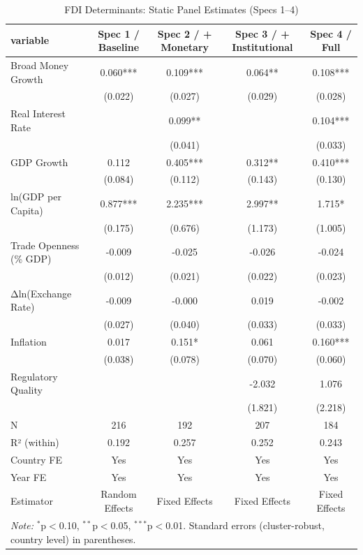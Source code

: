 \begin{table}[htbp]
\centering
\caption{FDI Determinants: Static Panel Estimates (Specs 1–4)}
\label{tab:regression_specs1_4}
\begin{tabular}{lcccc}
\hline\hline
variable & Spec 1 / Baseline & Spec 2 / + Monetary & Spec 3 / + Institutional & Spec 4 / Full \\
\hline
Broad Money Growth & 0.060*** & 0.109*** & 0.064** & 0.108*** \\
 & (0.022) & (0.027) & (0.029) & (0.028) \\
Real Interest Rate &  & 0.099** &  & 0.104*** \\
 &  & (0.041) &  & (0.033) \\
GDP Growth & 0.112 & 0.405*** & 0.312** & 0.410*** \\
 & (0.084) & (0.112) & (0.143) & (0.130) \\
ln(GDP per Capita) & 0.877*** & 2.235*** & 2.997** & 1.715* \\
 & (0.175) & (0.676) & (1.173) & (1.005) \\
Trade Openness (\% GDP) & -0.009 & -0.025 & -0.026 & -0.024 \\
 & (0.012) & (0.021) & (0.022) & (0.023) \\
Δln(Exchange Rate) & -0.009 & -0.000 & 0.019 & -0.002 \\
 & (0.027) & (0.040) & (0.033) & (0.033) \\
Inflation & 0.017 & 0.151* & 0.061 & 0.160*** \\
 & (0.038) & (0.078) & (0.070) & (0.060) \\
Regulatory Quality &  &  & -2.032 & 1.076 \\
 &  &  & (1.821) & (2.218) \\
\hline
N & 216 & 192 & 207 & 184 \\
R² (within) & 0.192 & 0.257 & 0.252 & 0.243 \\
Country FE & Yes & Yes & Yes & Yes \\
Year FE & Yes & Yes & Yes & Yes \\
Estimator & Random Effects & Fixed Effects & Fixed Effects & Fixed Effects \\
\hline\hline
\multicolumn{5}{l}{\textit{Note:} $^{*}$p$<$0.10, $^{**}$p$<$0.05, $^{***}$p$<$0.01. Standard errors (cluster-robust, country level) in parentheses.}
\end{tabular}
\end{table}